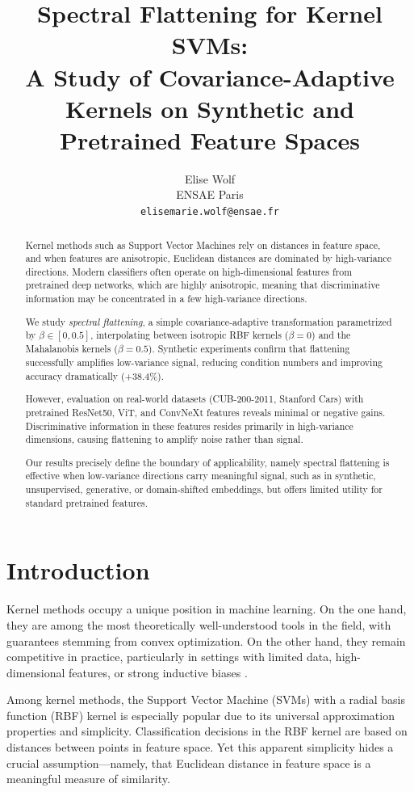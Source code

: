\documentclass{article}
\title{Spectral Flattening for Kernel SVMs:\\
A Study of Covariance-Adaptive Kernels on Synthetic and Pretrained Feature Spaces}
\author{
Elise Wolf\\
ENSAE Paris\\
\texttt{elisemarie.wolf@ensae.fr}
}
\begin{document}
\maketitle

\begin{abstract}

Kernel methods such as Support Vector Machines rely on distances in feature space, and when features are anisotropic, Euclidean distances are dominated by high-variance directions. Modern classifiers often operate on high-dimensional features from pretrained deep networks, which are highly anisotropic, meaning that discriminative information may be concentrated in a few high-variance directions.  

We study \emph{spectral flattening}, a simple covariance-adaptive transformation parametrized by $\beta \in [0, 0.5]$, interpolating between isotropic RBF kernels ($\beta=0$) and the Mahalanobis kernels ($\beta=0.5$). Synthetic experiments confirm that flattening successfully amplifies low-variance signal, reducing condition numbers and improving accuracy dramatically (+38.4\%).  

However, evaluation on real-world datasets (CUB-200-2011, Stanford Cars) with pretrained ResNet50, ViT, and ConvNeXt features reveals minimal or negative gains. Discriminative information in these features resides primarily in high-variance dimensions, causing flattening to amplify noise rather than signal.  

Our results precisely define the boundary of applicability, namely spectral flattening is effective when low-variance directions carry meaningful signal, such as in synthetic, unsupervised, generative, or domain-shifted embeddings, but offers limited utility for standard pretrained features.
\end{abstract}

\section{Introduction}

Kernel methods occupy a unique position in machine learning. On the one hand, they are among the most theoretically well-understood tools in the field, with guarantees stemming from convex optimization. On the other hand, they remain competitive in practice, particularly in settings with limited data, high-dimensional features, or strong inductive biases \cite{scholkopf2002learning}.

Among kernel methods, the Support Vector Machine (SVMs) with a radial basis function (RBF) kernel is especially popular due to its universal approximation properties and simplicity. Classification decisions in the RBF kernel are based on distances between points in feature space. Yet this apparent simplicity hides a crucial assumption—namely, that Euclidean distance in feature space is a meaningful measure of similarity.
\end{document}
